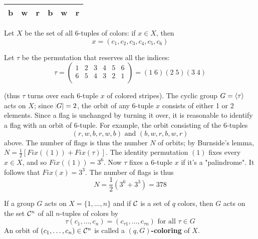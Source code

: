 \documentclass[11pt]{article}
\begin{document}
\begin{center}
\begin{tabular}{|c|c|c|c|c|c|}
\hline
b & w & r & b & w & r\\
\hline
\end{tabular}
\end{center}

Let \(X\) be the set of all 6-tuples of colors: if \(x\in X\), then
\begin{equation*}
x=(c_1,c_2,c_3,c_4,c_5,c_6)
\end{equation*}

Let \(\tau\) be the permutation that reserves all the indices:
\[
\tau=\begin{pmatrix}
 1 & 2 & 3 & 4 & 5 & 6 \\
 6 & 5 & 4 & 3 & 2 & 1 \\
\end{pmatrix}=(1\;6)(2\;5)(3\;4)
\]

(thus \(\tau\) turns over each 6-tuple \(x\) of colored stripes). The cyclic group
\(G=\langle\tau\rangle\) acts on \(X\); since \(\abs{G}=2\), the orbit of any 6-tuple \(x\)
consists of either 1 or 2 elements. Since a flag is unchanged by turning it
over, it is reasonable to identify a flag with an orbit of 6-tuple. For example,
the orbit consisting of the 6-tuples
\begin{equation*}
(r,w,b,r,w,b)\text{ and }(b,w,r,b,w,r)
\end{equation*}
above. The number of flags is thus the number \(N\) of orbits; by Burnside's
lemma, \(N=\frac{1}{2}[Fix((1))+Fix(\tau)]\). The identity permutation \((1)\) fixes
every \(x\in X\), and so \(Fix((1))=3^6\). Now \(\tau\) fixes a 6-tuple \(x\) if it's a
"palindrome". It follows that \(Fix(x)=3^3\). The number of flags is thus
\begin{equation*}
N=\frac{1}{2}(3^6+3^3)=378
\end{equation*}

\begin{definition}[]
If a group \(G\) acts on \(X=\{1,\dots,n\}\) and if \(\mathcal{C}\) is a set of \(q\) colors,
then \(G\) acts on the set \(\mathcal{C}^n\) of all \(n\)-tuples of colors by
\begin{equation*}
\tau(c_1,\dots,c_n)=(c_{\tau1},\dots,c_{\tau n})\text{ for all }\tau\in G
\end{equation*}
An orbit of \((c_1,\dots,c_n)\in\mathcal{C}^n\) is called a \textbf{\((q,G)\)-coloring} of \(X\).
\end{definition}
\end{document}
